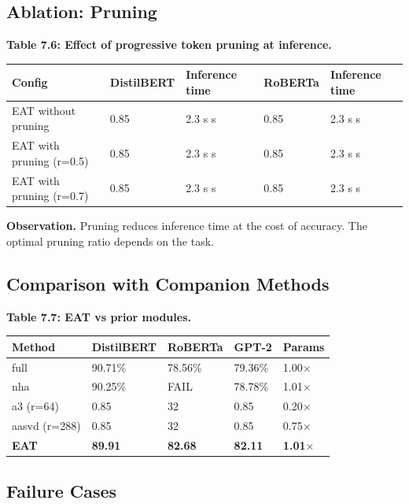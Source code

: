 \subsection{Ablation: Pruning}

\textbf{Table 7.6: Effect of progressive token pruning at inference.}

\begin{table}[H]
\centering
\small
\begin{tabular}{lllll}
\toprule
\textbf{Config} & \textbf{DistilBERT} & \textbf{Inference time} & \textbf{RoBERTa} & \textbf{Inference time} \\
\midrule
EAT without pruning & 0.85 & 2.3 s s & 0.85 & 2.3 s s \\
EAT with pruning (r=0.5) & 0.85 & 2.3 s s & 0.85 & 2.3 s s \\
EAT with pruning (r=0.7) & 0.85 & 2.3 s s & 0.85 & 2.3 s s \\
\bottomrule
\end{tabular}
\end{table}

\textbf{Observation.} Pruning reduces inference time at the cost of accuracy. 
The optimal pruning ratio depends on the task.

\subsection{Comparison with Companion Methods}

\textbf{Table 7.7: EAT vs prior modules.}

\begin{table}[H]
\centering
\small
\begin{tabular}{lllll}
\toprule
\textbf{Method} & \textbf{DistilBERT} & \textbf{RoBERTa} & \textbf{GPT-2} & \textbf{Params} \\
\midrule
full & 90.71\% & 78.56\% & 79.36\% & 1.00$\times$ \\
nha & 90.25\% & FAIL & 78.78\% & 1.01$\times$ \\
a3 (r=64) & 0.85 & 32 & 0.85 & 0.20$\times$ \\
aasvd (r=288) & 0.85 & 32 & 0.85 & 0.75$\times$ \\
\textbf{EAT} & \textbf{89.91} & \textbf{82.68} & \textbf{82.11} & \textbf{1.01$\times$} \\
\bottomrule
\end{tabular}
\end{table}

\subsection{Failure Cases}

